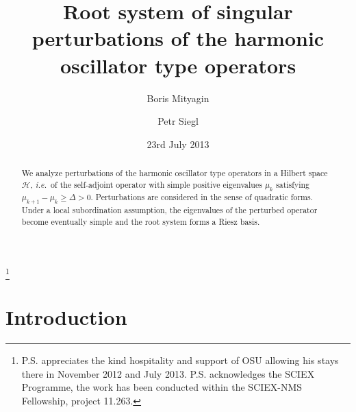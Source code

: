 
\usepackage{amsmath, amsthm, amsfonts, amssymb, mathrsfs}



\theoremstyle{plain}
\newtheorem{define}{Definition}
\newtheorem{theorem}{Theorem}
\newtheorem{lemma}[theorem]{Lemma}
\newtheorem{criterion}[theorem]{Criterion}
\newtheorem{proposition}[theorem]{Proposition}
\newtheorem{corollary}[theorem]{Corollary}

\newtheorem{example}[theorem]{Example}
\theoremstyle{remark}
\newtheorem{remark}{Remark}

\title[Root system]{Root system of singular perturbations of the harmonic oscillator type operators}

\author{Boris Mityagin}
\address[Boris Mityagin]{
Department of Mathematics
The Ohio State University
231 West 18th Ave.
Columbus, OH 43210, USA}

\author{Petr Siegl}
\address[Petr Siegl]{Mathematishes Institut, Universit\"at Bern, Sidlerstrasse 5, 3006 Bern, Switzerland \& On leave from Nuclear Physics Institute ASCR, 25068 \v Re\v z, Czech Republic}



\date{23rd July 2013}

\begin{abstract}
We analyze perturbations of the harmonic oscillator type operators in a Hilbert space ${{\mathcal{H}}}$, {{\emph{i.e.}}}~of the self-adjoint operator with simple positive eigenvalues $\mu_k$ satisfying $\mu_{k+1}-\mu_k \geq \Delta >0$. Perturbations are considered in the sense of quadratic forms. Under a local subordination assumption, the eigenvalues of the perturbed operator become eventually simple and the root system forms a Riesz basis. 
\end{abstract}

\thanks{
P.S. appreciates the kind hospitality and support of OSU allowing his stays there in November 2012 and July 2013. P.S. acknowledges the SCIEX Programme, the work has been conducted within the SCIEX-NMS Fellowship, project 11.263.
}

\maketitle

\section{Introduction}

